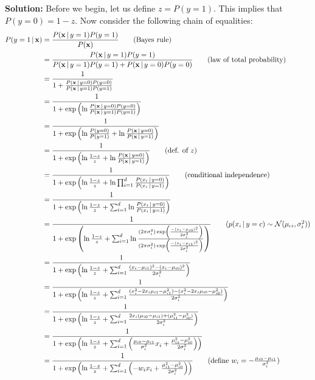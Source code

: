 \documentclass{article}
\renewcommand{\vec}[1]{\mathbf{#1}}
\newcommand{\cond}{\,|\,}
\begin{document}
\noindent\textbf{Solution:} Before we begin, let us define $z=P(y=1)$. This implies that $P(y=0)=1-z$. Now consider the following chain of equalities:
\begin{align*}
  P(y=1\cond\vec x)&=\frac{P(\vec x\cond y=1)P(y=1)}{P(\vec x)}\tag{Bayes rule}\\
  &=\frac{P(\vec x\cond y=1)P(y=1)}{P(\vec x\cond y=1)P(y=1)+P(\vec x\cond y=0)P(y=0)}\tag{law of total probability}\\
  &=\frac{1}{1+\frac{P(\vec x\cond y=0)P(y=0)}{P(\vec x\cond y=1)P(y=1)}}\\
  &=\frac{1}{1+\exp\left(\ln\frac{P(\vec x\cond y=0)P(y=0)}{P(\vec x\cond y=1)P(y=1)}\right)}\\
  &=\frac{1}{1+\exp\left(\ln\frac{P(y=0)}{P(y=1)}+\ln\frac{P(\vec x\cond y=0)}{P(\vec x\cond y=1)}\right)}\\
  &=\frac{1}{1+\exp\left(\ln\frac{1-z}{z}+\ln\frac{P(\vec x\cond y=0)}{P(\vec x\cond y=1)}\right)}\tag{def. of $z$}\\
  &=\frac{1}{1+\exp\left(\ln\frac{1-z}{z}+\ln\prod_{i=1}^d\frac{P(x_i\cond y=0)}{P(x_i\cond y=1)}\right)}\tag{conditional independence}\\
  &=\frac{1}{1+\exp\left(\ln\frac{1-z}{z}+\sum_{i=1}^d\ln\frac{P(x_i\cond y=0)}{P(x_i\cond y=1)}\right)}\\
  &=\frac{1}{1+\exp\left(\ln\frac{1-z}{z}+\sum_{i=1}^d\ln\frac{(2\pi\sigma^2_i)\exp\left(\frac{-(x_i-\mu_{i0})^2}{2\sigma^2_i}\right)}{(2\pi\sigma^2_i)\exp\left(\frac{-(x_i-\mu_{i1})^2}{2\sigma^2_i}\right)}\right)}\tag{$p(x_i\cond y=c)\sim\mathcal N(\mu_{ci},\sigma_i^2)$}\\
  &=\frac{1}{1+\exp\left(\ln\frac{1-z}{z}+\sum_{i=1}^d\frac{(x_i-\mu_{i1})^2-(x_i-\mu_{i0})^2}{2\sigma^2_i}\right)}\\
  &=\frac{1}{1+\exp\left(\ln\frac{1-z}{z}+\sum_{i=1}^d\frac{(x_i^2-2x_i\mu_{i1}-\mu_{i1}^2)-(x_i^2-2x_i\mu_{i0}-\mu_{i0}^2)}{2\sigma^2_i}\right)}\\
  &=\frac{1}{1+\exp\left(\ln\frac{1-z}{z}+\sum_{i=1}^d\frac{2x_i(\mu_{i0}-\mu_{i1})+(\mu_{i1}^2-\mu_{i0}^2)}{2\sigma^2_i}\right)}\\
  &=\frac{1}{1+\exp\left(\ln\frac{1-z}{z}+\sum_{i=1}^d\left(\frac{\mu_{i0}-\mu_{i1}}{\sigma^2_i}x_i+\frac{\mu_{i1}^2-\mu_{i0}^2}{2\sigma^2_i}\right)\right)}\\
  &=\frac{1}{1+\exp\left(\ln\frac{1-z}{z}+\sum_{i=1}^d\left(-w_ix_i+\frac{\mu_{i1}^2-\mu_{i0}^2}{2\sigma^2_i}\right)\right)}\tag{define $w_i=-\frac{\mu_{i0}-\mu_{i1}}{\sigma_i^2}$}\\

\end{align*}
\end{document}
